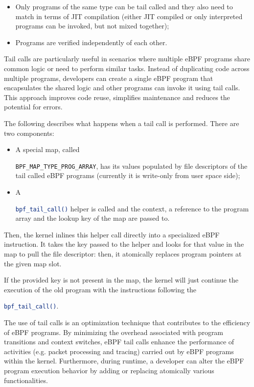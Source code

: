 \begin{itemize}
	\item 
		Only programs of the same type can be tail called and they also need to match in terms of JIT compilation (either JIT compiled or only interpreted programs can be invoked, but not mixed together);
	\item 
		Programs are verified independently of each other.
\end{itemize}

Tail calls are particularly useful in scenarios where multiple eBPF programs share common logic or need to perform similar tasks. 
Instead of duplicating code across multiple programs, developers can create a single eBPF program that encapsulates the shared logic and other programs can invoke it using tail calls. 
This approach improves code reuse, simplifies maintenance and reduces the potential for errors.

The following describes what happens when a tail call is performed. 
There are two components:

\begin{itemize}
	\item 
		A special map, called \raggedright\colorbox{backcolour}{\lstinline[style=commandline, language=bash]|BPF_MAP_TYPE_PROG_ARRAY|}, has its values populated by file descriptors of the tail called eBPF programs (currently it is write-only from user space side);
	\item 
		A \raggedright\colorbox{backcolour}{\lstinline[style=commandline, language=bash]|bpf_tail_call()|} helper is called and the context, a reference to the program array and the lookup key of the map are passed to. 
\end{itemize}

Then, the kernel inlines this helper call directly into a specialized eBPF instruction.
It takes the key passed to the helper and looks for that value in the map to pull the file descriptor: then, it atomically replaces program pointers at the given map slot. 

If the provided key is not present in the map, the kernel will just continue the execution of the old program with the instructions following the \raggedright\colorbox{backcolour}{\lstinline[style=commandline, language=bash]|bpf_tail_call()|}.

The use of tail calls is an optimization technique that contributes to the efficiency of eBPF programs. 
By minimizing the overhead associated with program transitions and context switches, eBPF tail calls enhance the performance of activities (e.g. packet processing and tracing) carried out by eBPF programs within the kernel.
Furthermore, during runtime, a developer can alter the eBPF program execution behavior by adding or replacing atomically various functionalities.

